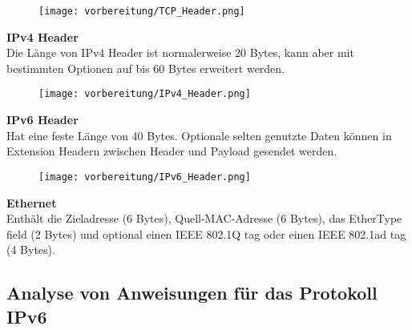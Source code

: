     \begin{figure}[ht]
        \centering
        \texttt{[image: vorbereitung/TCP\_Header.png]}
    \end{figure}

    \textbf{IPv4 Header}
    \\
    Die Länge von IPv4 Header ist normalerweise 20 Bytes, kann aber mit bestimmten Optionen auf bis 60 Bytes erweitert werden.\\

    \begin{figure}[ht]
        \centering
        \texttt{[image: vorbereitung/IPv4\_Header.png]}
    \end{figure}

    \textbf{IPv6 Header}
    \\
    Hat eine feste Länge von 40 Bytes. Optionale selten genutzte Daten können in Extension Headern zwischen Header und Payload gesendet werden.\\

    \begin{figure}[ht]
        \centering
        \texttt{[image: vorbereitung/IPv6\_Header.png]}
    \end{figure}

    \textbf{Ethernet}
    \\
    Enthält die Zieladresse (6 Bytes), Quell-MAC-Adresse (6 Bytes), das EtherType field (2 Bytes) und optional einen IEEE 802.1Q tag oder einen IEEE 802.1ad tag (4 Bytes).

\subsection{Analyse von Anweisungen für das Protokoll IPv6}
    